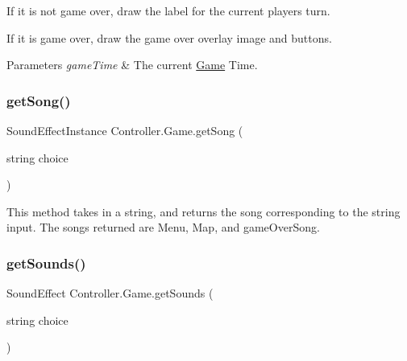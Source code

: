 \begin{DoxyItemize}
\item If it is not game over, draw the label for the current player\textquotesingle{}s turn. ~\newline

\item If it is game over, draw the game over overlay image and buttons. ~\newline
 
\begin{DoxyParams}{Parameters}
{\em game\+Time} & The current \hyperlink{class_controller_1_1_game}{Game} Time. \\
\hline
\end{DoxyParams}

\end{DoxyItemize}\hypertarget{class_controller_1_1_game_a2bc0cb0de0a3bb75b54c27b482870ca0}{}\label{class_controller_1_1_game_a2bc0cb0de0a3bb75b54c27b482870ca0} 
\subsubsection{\texorpdfstring{get\+Song()}{getSong()}}
{\footnotesize\ttfamily Sound\+Effect\+Instance Controller.\+Game.\+get\+Song (\begin{DoxyParamCaption}\item[{string}]{choice }\end{DoxyParamCaption})\hspace{0.3cm}{\ttfamily [inline]}}

This method takes in a string, and returns the song corresponding to the string input. The songs returned are Menu, Map, and game\+Over\+Song. \hypertarget{class_controller_1_1_game_ab177e0ab61ac7144e08b20c6835c2c7c}{}\label{class_controller_1_1_game_ab177e0ab61ac7144e08b20c6835c2c7c} 
\subsubsection{\texorpdfstring{get\+Sounds()}{getSounds()}}
{\footnotesize\ttfamily Sound\+Effect Controller.\+Game.\+get\+Sounds (\begin{DoxyParamCaption}\item[{string}]{choice }\end{DoxyParamCaption})\hspace{0.3cm}{\ttfamily [inline]}}

